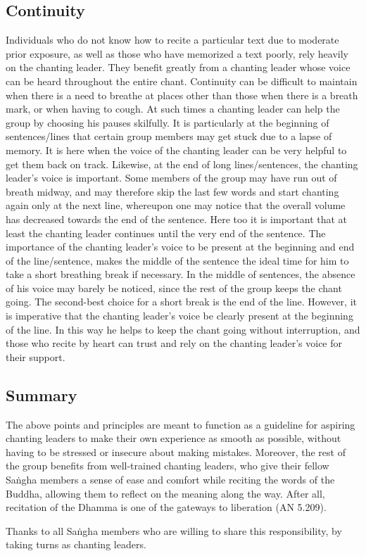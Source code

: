 \subsection*{Continuity}
\begin{justify}
  Individuals who do not know how to recite a particular text due to moderate prior exposure, as well as those who have memorized a text poorly, rely heavily on the chanting leader. They benefit greatly from a chanting leader whose voice can be heard throughout the entire chant. Continuity can be difficult to maintain when there is a need to breathe at places other than those when there is a breath mark, or when having to cough. At such times a chanting leader can help the group by choosing his pauses skilfully. It is particularly at the beginning of sentences/lines that certain group members may get stuck due to a lapse of memory. It is here when the voice of the chanting leader can be very helpful to get them back on track. Likewise, at the end of long lines/sentences, the chanting leader's voice is important. Some members of the group may have run out of breath midway, and may therefore skip the last few words and start chanting again only at the next line, whereupon one may notice that the overall volume has decreased towards the end of the sentence. Here too it is important that at least the chanting leader continues until the very end of the sentence. The importance of the chanting leader's voice to be present at the beginning and end of the line/sentence, makes the middle of the sentence the ideal time for him to take a short breathing break if necessary. In the middle of sentences, the absence of his voice may barely be noticed, since the rest of the group keeps the chant going. The second-best choice for a short break is the end of the line. However, it is imperative that the chanting leader's voice be clearly present at the beginning of the line. In this way he helps to keep the chant going without interruption, and those who recite by heart can trust and rely on the chanting leader's voice for their support.
\end{justify}

\subsection*{Summary}
\begin{justify}
  The above points and principles are meant to function as a guideline for aspiring chanting leaders to make their own experience as smooth as possible, without having to be stressed or insecure about making mistakes. Moreover, the rest of the group benefits from well-trained chanting leaders, who give their fellow Saṅgha members a sense of ease and comfort while reciting the words of the Buddha, allowing them to reflect on the meaning along the way. After all, recitation of the Dhamma is one of the gateways to liberation (AN 5.209).
\end{justify}

\begin{justify}
  Thanks to all Saṅgha members who are willing to share this responsibility, by taking turns as chanting leaders.
\end{justify}


